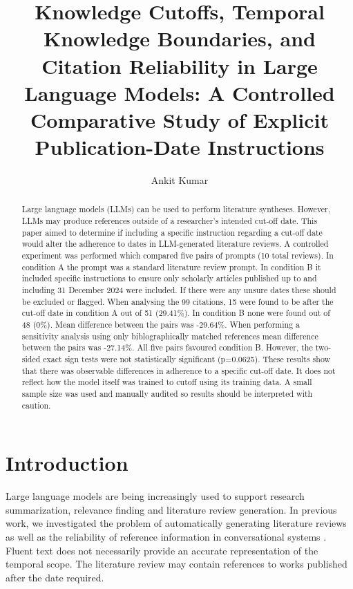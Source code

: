 \documentclass[manuscript]{acmart}
\begin{document}
\title{Knowledge Cutoffs, Temporal Knowledge Boundaries, and Citation Reliability in Large Language Models: A Controlled Comparative Study of Explicit Publication-Date Instructions}

\author{Ankit Kumar}

\begin{abstract}
Large language models (LLMs) can be used to perform literature syntheses. However, LLMs may produce references outside of a researcher's intended cut-off date. This paper aimed to determine if including a specific instruction regarding a cut-off date would alter the adherence to dates in LLM-generated literature reviews. A controlled experiment was performed which compared five pairs of prompts (10 total reviews). In condition A the prompt was a standard literature review prompt. In condition B it included specific instructions to ensure only scholarly articles published up to and including 31 December 2024 were included. If there were any unsure dates these should be excluded or flagged. When analysing the 99 citations, 15 were found to be after the cut-off date in condition A out of 51 (29.41\%). In condition B none were found out of 48 (0\%). Mean difference between the pairs was -29.64\%. When performing a sensitivity analysis using only biblographically matched references mean difference between the pairs was -27.14\%. All five pairs favoured condition B. However, the two-sided exact sign tests were not statistically significant (p=0.0625). These results show that there was observable differences in adherence to a specific cut-off date. It does not reflect how the model itself was trained to cutoff using its training data. A small sample size was used and manually audited so results should be interpreted with caution.
\end{abstract}


\maketitle
\pagestyle{plain}

\section{Introduction}
Large language models are being increasingly used to support research summarization, relevance finding and literature review generation. In previous work, we investigated the problem of automatically generating literature reviews as well as the reliability of reference information in conversational systems \cite{kasanishi2023scireviewgen,chelli2024hallucination}. Fluent text does not necessarily provide an accurate representation of the temporal scope. The literature review may contain references to works published after the date required.
\end{document}
